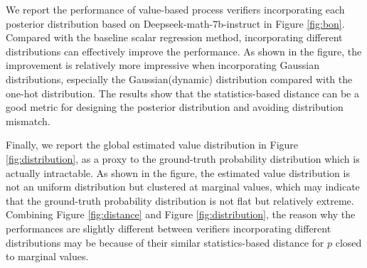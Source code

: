We report the performance of value-based process verifiers incorporating each posterior distribution based on Deepseek-math-7b-instruct in Figure \ref{fig:bon}. Compared with the baseline scalar regression method, incorporating different distributions can effectively improve the performance. As shown in the figure, the improvement is relatively more impressive when incorporating Gaussian distributions, especially the Gaussian(dynamic) distribution compared with the one-hot distribution. The results show that the statistics-based distance can be a good metric for designing the posterior distribution and avoiding distribution mismatch. 

Finally, we report the global estimated value distribution in Figure \ref{fig:distribution}, as a proxy to the ground-truth probability distribution which is actually intractable. As shown in the figure, the estimated value distribution is not an uniform distribution but clustered at marginal values, which may indicate that the ground-truth probability distribution is not flat but relatively extreme. Combining Figure \ref{fig:distance} and Figure \ref{fig:distribution}, the reason why the performances are slightly different between verifiers incorporating different distributions may be because of their similar statistics-based distance for $p$ closed to marginal values.

